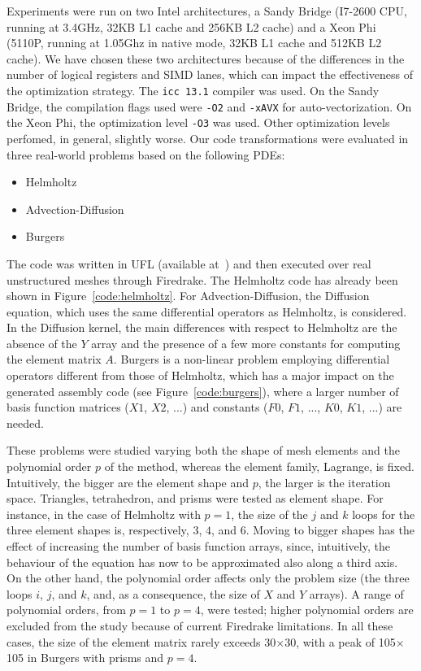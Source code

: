 \documentclass[conference]{IEEEtran}
\begin{document}
Experiments were run on two Intel architectures, a Sandy Bridge (I7-2600 CPU, running at 3.4GHz, 32KB L1 cache and 256KB L2 cache) and a Xeon Phi (5110P, running at 1.05Ghz in native mode, 32KB L1 cache and 512KB L2 cache). We have chosen these two architectures because of the differences in the number of logical registers and SIMD lanes, which can impact the effectiveness of the optimization strategy. The \texttt{icc 13.1} compiler was used. On the Sandy Bridge, the compilation flags used were \texttt{-O2} and \texttt{-xAVX} for auto-vectorization. On the Xeon Phi, the optimization level \texttt{-O3} was used. Other optimization levels perfomed, in general, slightly worse. Our code transformations were evaluated in three real-world problems based on the following PDEs:
\begin{itemize}
\item Helmholtz
\item Advection-Diffusion
\item Burgers
\end{itemize}
The code was written in UFL (available at~\cite{ufl-code}) and then executed over real unstructured meshes through Firedrake. The Helmholtz code has already been shown in Figure~\ref{code:helmholtz}. For Advection-Diffusion, the Diffusion equation, which uses the same differential operators as Helmholtz, is considered. In the Diffusion kernel, the main differences with respect to Helmholtz are the absence of the $Y$ array and the presence of a few more constants for computing the element matrix $A$. Burgers is a non-linear problem employing differential operators different from those of Helmholtz, which has a major impact on the generated assembly code (see Figure~\ref{code:burgers}), where a larger number of basis function matrices ($X1$, $X2$, ...) and constants ($F0$, $F1$, ..., $K0$, $K1$, ...) are needed. 

These problems were studied varying both the shape of mesh elements and the polynomial order $p$ of the method, whereas the element family, Lagrange, is fixed. Intuitively, the bigger are the element shape and $p$, the larger is the iteration space. Triangles, tetrahedron, and prisms were tested as element shape. For instance, in the case of Helmholtz with $p=1$, the size of the $j$ and $k$ loops for the three element shapes is, respectively, $3$, $4$, and $6$. Moving to bigger shapes has the effect of increasing the number of basis function arrays, since, intuitively, the behaviour of the equation has now to be approximated also along a third axis. On the other hand, the polynomial order affects only the problem size (the three loops $i$, $j$, and $k$, and, as a consequence, the size of $X$ and $Y$ arrays). A range of polynomial orders, from $p=1$ to $p=4$, were tested; higher polynomial orders are excluded from the study because of current Firedrake limitations. In all these cases, the size of the element matrix rarely exceeds 30$\times$30, with a peak of 105$\times$105 in Burgers with prisms and $p=4$.
\end{document}
